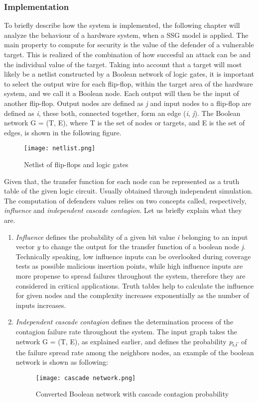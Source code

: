 \documentclass[conference]{IEEEtran}
\begin{document}
\subsubsection{Implementation}
To briefly describe how the system is implemented, the following chapter will analyze the behaviour of a hardware system, when a SSG model is applied.
The main property to compute for security is the value of the defender of a vulnerable target. This is realized of the combination of how succesful an attack can be and the individual value of the target. Taking into account that a target will most likely be a netlist constructed by a Boolean network of logic gates, it is important to select the output wire for each flip-flop, within the target area of the hardware system, and we call it a Boolean node. Each output will then be the input of another flip-flop. Output nodes are defined as \textit{j} and input nodes to a flip-flop are defined as \textit{i}, these both, connected together, form an edge (\textit{i}, \textit{j}). The Boolean network G = (T, E), where T is the set of nodes or targets, and E is the set of edges, is shown in the following figure.
\begin{figure}[h]
    \centerline{\texttt{[image: netlist.png]}}
    \caption{Netlist of flip-flops and logic gates}
    \label{netlist}
\end{figure} 

Given that, the transfer function for each node can be represented as a truth table of the given logic circuit. Usually obtained through independent simulation. The computation of defenders values relies on two concepts called, respectively, \textit{influence} and \textit{independent cascade contagion}. Let us briefly explain what they are.
\begin{enumerate}
\item \textit{Influence} defines the probability of a given bit value \textit{i} belonging to an input vector \textit{y} to change the output  for the transfer function of a boolean node \textit{j}. Technically speaking, low influence inputs can be overlooked during coverage tests as possible malicious insertion points, while high influence inputs are more propense to spread failures throughout the system, therefore they are considered in critical applications. Truth tables help to calculate the influence for given nodes and the complexity increases exponentially as the number of inputs increases.
\item \textit{Independent cascade contagion} defines the determination process of the contagion failure rate throughout the system. The input graph takes the network G = (T, E), as explained earlier, and defines the probability \textit{p}\textsubscript{i,i'} of the failure spread rate among the neighbors nodes, an example of the boolean network is shown as following:
\begin{figure}[h]
    \centerline{\texttt{[image: cascade network.png]}}
    \caption{Converted Boolean network with cascade contagion probability}
    \label{cascade}
\end{figure} 

\end{enumerate}
\end{document}
